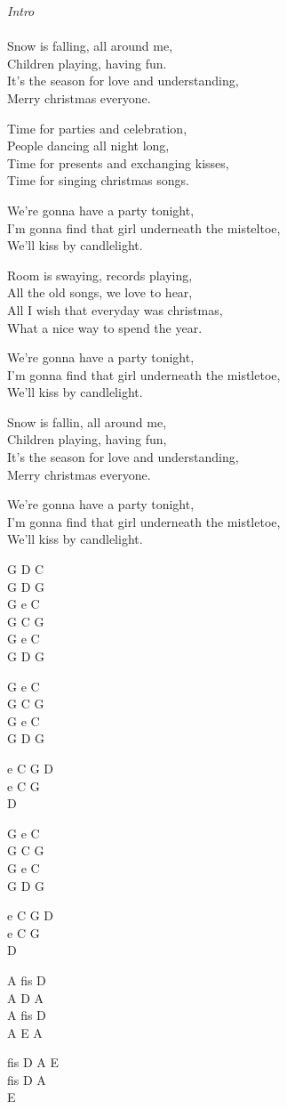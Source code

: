 \begin{text}
    \textit{Intro}\\
	\\
    Snow is falling, all around me,\\
    Children playing, having fun.\\
	It's the season for love and understanding,\\
	Merry christmas everyone.
	
	Time for parties and celebration,\\
	People dancing all night long,\\
	Time for presents and exchanging kisses,\\
	Time for singing christmas songs.
	
	We're gonna have a party tonight,\\
	I'm gonna find that girl underneath the misteltoe,\\
	We'll kiss by candlelight.
	
	Room is swaying, records playing,\\
	All the old songs, we love to hear,\\
	All I wish that everyday was christmas,\\
	What a nice way to spend the year.
	
	We're gonna have a party tonight,\\
	I'm gonna find that girl underneath the mistletoe,\\
	We'll kiss by candlelight.
	
	Snow is fallin, all around me,\\
	Children playing, having fun,\\
	It's the season for love and understanding,\\
	Merry christmas everyone.
	
	We're gonna have a party tonight,\\
	I'm gonna find that girl underneath the mistletoe,\\
	We'll kiss by candlelight.
\end{text}
\begin{chord}
    G D C\\
	G D G\\
	G e C\\
	G C G\\
	G e C\\
	G D G
	
    G e C\\
	G C G\\
	G e C\\
	G D G
	
	e C G D\\
	e C G\\
	D
	
	G e C\\
	G C G\\
	G e C\\
	G D G
	
	e C G D\\
	e C G\\
	D
	
	A fis D\\
	A D A\\
	A fis D\\
	A E A
	
	fis D A E\\
	fis D A\\
	E
\end{chord}